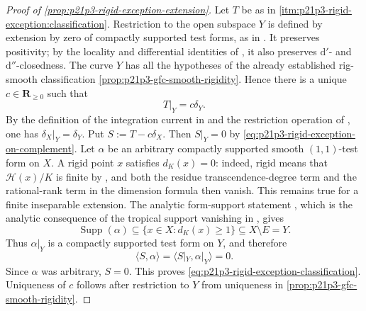 \begin{proof}[Proof of
\cref{prop:p21p3-rigid-exception-extension}]
Let $T$ be as in
\cref{itm:p21p3-rigid-exception:classification}.  Restriction to the open
subspace $Y$ is defined by extension by zero of compactly supported test
forms, as in \cite[\S7.1.6]{CLD25}.  It preserves positivity; by the locality
and differential identities of \cite[\S\S7.7.1--7.7.3]{CLD25}, it also
preserves $\mathrm d'$- and $\mathrm d''$-closedness.  The curve $Y$ has all
the hypotheses of the already established rig-smooth classification
\cref{prop:p21p3-gfc-smooth-rigidity}.  Hence there is a unique
$c\in\mathbf R_{\geq0}$ such that
\begin{equation}
\label{eq:p21p3-rigid-exception-on-complement}
                            T|_Y=c\delta_Y.
\end{equation}
By the definition of the integration current in
\cite[\S7.3.1]{CLD25} and the restriction operation of
\cite[\S7.1.6]{CLD25}, one has $\delta_X|_Y=\delta_Y$.  Put
$S:=T-c\delta_X$.  Then $S|_Y=0$ by
\eqref{eq:p21p3-rigid-exception-on-complement}.  Let $\alpha$ be an
arbitrary compactly supported smooth $(1,1)$-test form on $X$.  A rigid
point $x$ satisfies $d_K(x)=0$: indeed, rigid means that
$\mathscr H(x)/K$ is finite by \cite[\S11.1.10]{CLD25}, and both the residue
transcendence-degree term and the rational-rank term in the dimension formula
\cite[(11.2.3.1)]{CLD25} then vanish.  This remains true for a finite
inseparable extension.  The analytic form-support statement
\cite[Proposition~15.2.1(a)]{CLD25}, which is the analytic consequence of
the tropical support vanishing in \cite[Proposition~3.3.6]{CLD25}, gives
\begin{equation}
\label{eq:p21p3-rigid-exception-test-support}
 \operatorname{Supp}(\alpha)
 \subseteq\{x\in X:d_K(x)\geq1\}
 \subseteq X\setminus E=Y.
\end{equation}
Thus $\alpha|_Y$ is a compactly supported test form on $Y$, and therefore
\[
                   \langle S,\alpha\rangle
                   =\langle S|_Y,\alpha|_Y\rangle=0.
\]
Since $\alpha$ was arbitrary, $S=0$.  This proves
\eqref{eq:p21p3-rigid-exception-classification}.  Uniqueness of $c$ follows
after restriction to $Y$ from uniqueness in
\cref{prop:p21p3-gfc-smooth-rigidity}.


\end{proof}
